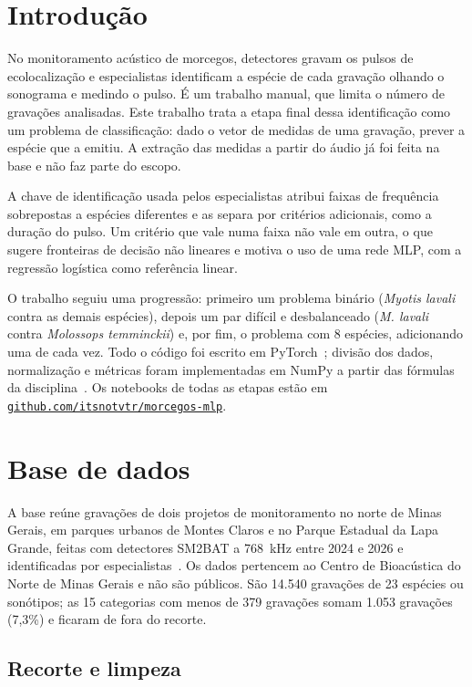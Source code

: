 \documentclass{sbrt}
\begin{document}
\section{Introdução}

No monitoramento acústico de morcegos, detectores gravam os pulsos de ecolocalização e especialistas identificam a espécie de cada gravação olhando o sonograma e medindo o pulso. É um trabalho manual, que limita o número de gravações analisadas. Este trabalho trata a etapa final dessa identificação como um problema de classificação: dado o vetor de medidas de uma gravação, prever a espécie que a emitiu. A extração das medidas a partir do áudio já foi feita na base e não faz parte do escopo.

A chave de identificação usada pelos especialistas atribui faixas de frequência sobrepostas a espécies diferentes e as separa por critérios adicionais, como a duração do pulso. Um critério que vale numa faixa não vale em outra, o que sugere fronteiras de decisão não lineares e motiva o uso de uma rede MLP, com a regressão logística como referência linear.

O trabalho seguiu uma progressão: primeiro um problema binário (\textit{Myotis lavali} contra as demais espécies), depois um par difícil e desbalanceado (\textit{M. lavali} contra \textit{Molossops temminckii}) e, por fim, o problema com 8 espécies, adicionando uma de cada vez. Todo o código foi escrito em PyTorch~\cite{pytorch}; divisão dos dados, normalização e métricas foram implementadas em NumPy a partir das fórmulas da disciplina~\cite{psi0325}. Os notebooks de todas as etapas estão em \href{https://github.com/itsnotvtr/morcegos-mlp}{\texttt{github.com/itsnotvtr/morcegos-mlp}}.

\section{Base de dados}

A base reúne gravações de dois projetos de monitoramento no norte de Minas Gerais, em parques urbanos de Montes Claros e no Parque Estadual da Lapa Grande, feitas com detectores SM2BAT a 768~kHz entre 2024 e 2026 e identificadas por especialistas~\cite{base}. Os dados pertencem ao Centro de Bioacústica do Norte de Minas Gerais e não são públicos. São 14.540 gravações de 23 espécies ou sonótipos; as 15 categorias com menos de 379 gravações somam 1.053 gravações (7,3\%) e ficaram de fora do recorte.

\subsection{Recorte e limpeza}
\end{document}
